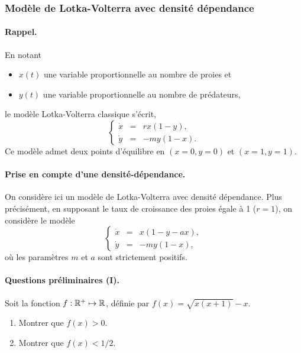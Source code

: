 \subsubsection{Modèle de Lotka-Volterra avec densité dépendance} 

\paragraph{Rappel.}
En notant 
\begin{itemize}
  \item $x(t)$ une variable proportionnelle au nombre de proies et
  \item $y(t)$ une variable proportionnelle au nombre de prédateurs,
\end{itemize}
le modèle Lotka-Volterra classique s'écrit, 
\begin{equation} \label{eq:LV}
\left\{\begin{array}{rcr}
        \dot x & = & r x (1 - y), \\ 
        \dot y & = & - m y (1 - x).
        \end{array}\right.
\end{equation}
Ce modèle admet deux points d'équilibre en $(x=0, y=0)$ et $(x=1, y=1)$.

\paragraph{Prise en compte d'une densité-dépendance.}
On considère ici un modèle de Lotka-Volterra avec densité dépendance. Plus précisément, en supposant le taux de croissance des proies égale à 1 ($r = 1$), on considère le modèle
\begin{equation} \label{eq:LVDD}
\left\{\begin{array}{rcr}
        \dot x & = & x (1 - y - ax), \\ 
        \dot y & = & - m y (1 - x), 
        \end{array}\right.
\end{equation}
où les paramètres $m$ et $a$ sont strictement positifs. 

\bigskip
\paragraph{Questions préliminaires (I).}
Soit la fonction $f: \mathbb{R}^+ \mapsto \mathbb{R}$, définie par $f(x) = \sqrt{x(x+1)} - x$.
\begin{enumerate}
  \item Montrer que $f(x) > 0$. \label{q:LVDD-f1}
  \item Montrer que $f(x) < 1/2$. \label{q:LVDD-f2}
\end{enumerate}

